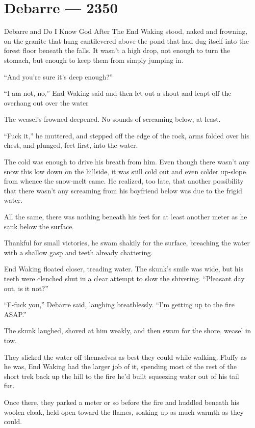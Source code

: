 \hypertarget{debarre-2350}{%
\chapter{Debarre — 2350}\label{debarre-2350}}

Debarre and Do I Know God After The End Waking stood, naked and frowning, on the granite that hung cantilevered above the pond that had dug itself into the forest floor beneath the falls. It wasn't a high drop, not enough to turn the stomach, but enough to keep them from simply jumping in.

``And you're sure it's deep enough?''

``I am not, no,'' End Waking said and then let out a shout and leapt off the overhang out over the water

The weasel's frowned deepened. No sounds of screaming below, at least.

``Fuck it,'' he muttered, and stepped off the edge of the rock, arms folded over his chest, and plunged, feet first, into the water.

The cold was enough to drive his breath from him. Even though there wasn't any snow this low down on the hillside, it was still cold out and even colder up-slope from whence the snow-melt came. He realized, too late, that another possibility that there wasn't any screaming from his boyfriend below was due to the frigid water.

All the same, there was nothing beneath his feet for at least another meter as he sank below the surface.

Thankful for small victories, he swam shakily for the surface, breaching the water with a shallow gasp and teeth already chattering.

End Waking floated closer, treading water. The skunk's smile was wide, but his teeth were clenched shut in a clear attempt to slow the shivering. ``Pleasant day out, is it not?''

``F-fuck you,'' Debarre said, laughing breathlessly. ``I'm getting up to the fire ASAP.''

The skunk laughed, shoved at him weakly, and then swam for the shore, weasel in tow.

They slicked the water off themselves as best they could while walking. Fluffy as he was, End Waking had the larger job of it, spending most of the rest of the short trek back up the hill to the fire he'd built squeezing water out of his tail fur.

Once there, they parked a meter or so before the fire and huddled beneath his woolen cloak, held open toward the flames, soaking up as much warmth as they could.

